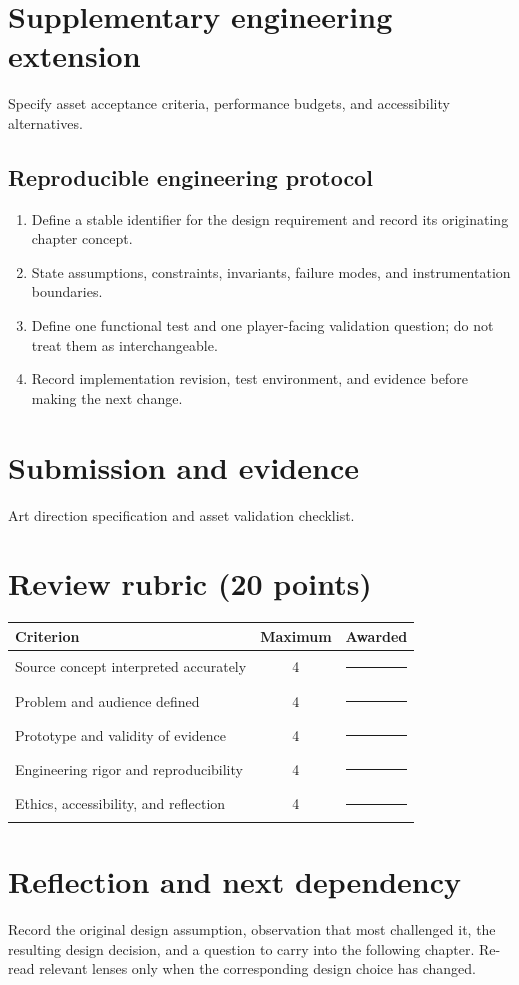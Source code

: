 \documentclass[11pt]{article}
\begin{document}
\section{Supplementary engineering extension}
Specify asset acceptance criteria, performance budgets, and accessibility alternatives.


\subsection{Reproducible engineering protocol}
\begin{enumerate}
\item Define a stable identifier for the design requirement and record its originating chapter concept.
\item State assumptions, constraints, invariants, failure modes, and instrumentation boundaries.
\item Define one functional test and one player-facing validation question; do not treat them as interchangeable.
\item Record implementation revision, test environment, and evidence before making the next change.
\end{enumerate}

\section{Submission and evidence}
Art direction specification and asset validation checklist.


\section{Review rubric (20 points)}
\begin{tabularx}{\linewidth}{@{}Xcc@{}}\toprule
Criterion & Maximum & Awarded \\ \midrule
Source concept interpreted accurately & 4 & \rule{0.45in}{0.4pt}\\
Problem and audience defined & 4 & \rule{0.45in}{0.4pt}\\
Prototype and validity of evidence & 4 & \rule{0.45in}{0.4pt}\\
Engineering rigor and reproducibility & 4 & \rule{0.45in}{0.4pt}\\
Ethics, accessibility, and reflection & 4 & \rule{0.45in}{0.4pt}\\\bottomrule
\end{tabularx}

\section{Reflection and next dependency}
Record the original design assumption, observation that most challenged it, the resulting design decision, and a question to carry into the following chapter. Re-read relevant lenses only when the corresponding design choice has changed.
\end{document}
